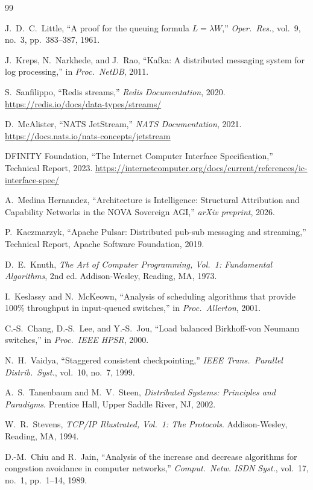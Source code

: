 \documentclass[12pt]{article}
\begin{document}
\begin{thebibliography}{99}

J.~D.~C.\ Little,
``A proof for the queuing formula $L = \lambda W$,''
\textit{Oper.\ Res.}, vol.~9, no.~3, pp.~383--387, 1961.

J.~Kreps, N.~Narkhede, and J.~Rao,
``Kafka: A distributed messaging system for log processing,''
in \textit{Proc.\ NetDB}, 2011.

S.~Sanfilippo,
``Redis streams,''
\textit{Redis Documentation}, 2020.
\url{https://redis.io/docs/data-types/streams/}

D.~McAlister,
``NATS JetStream,''
\textit{NATS Documentation}, 2021.
\url{https://docs.nats.io/nats-concepts/jetstream}

DFINITY Foundation,
``The Internet Computer Interface Specification,''
Technical Report, 2023.
\url{https://internetcomputer.org/docs/current/references/ic-interface-spec/}

A.~Medina Hernandez,
``Architecture is Intelligence: Structural Attribution and Capability Networks
in the NOVA Sovereign AGI,''
\textit{arXiv preprint}, 2026.

P.~Kaczmarzyk,
``Apache Pulsar: Distributed pub-sub messaging and streaming,''
Technical Report, Apache Software Foundation, 2019.

D.~E.\ Knuth,
\textit{The Art of Computer Programming, Vol.\ 1: Fundamental Algorithms},
2nd ed.
Addison-Wesley, Reading, MA, 1973.

I.~Keslassy and N.~McKeown,
``Analysis of scheduling algorithms that provide 100\% throughput in input-queued
switches,''
in \textit{Proc.\ Allerton}, 2001.

C.-S.\ Chang, D.-S.\ Lee, and Y.-S.\ Jou,
``Load balanced Birkhoff-von Neumann switches,''
in \textit{Proc.\ IEEE HPSR}, 2000.

N.~H.\ Vaidya,
``Staggered consistent checkpointing,''
\textit{IEEE Trans.\ Parallel Distrib.\ Syst.}, vol.~10, no.~7, 1999.

A.~S.\ Tanenbaum and M.~V.\ Steen,
\textit{Distributed Systems: Principles and Paradigms}.
Prentice Hall, Upper Saddle River, NJ, 2002.

W.~R.\ Stevens,
\textit{TCP/IP Illustrated, Vol.\ 1: The Protocols}.
Addison-Wesley, Reading, MA, 1994.

D.-M.\ Chiu and R.~Jain,
``Analysis of the increase and decrease algorithms for congestion avoidance in
computer networks,''
\textit{Comput.\ Netw. ISDN Syst.}, vol.~17, no.~1, pp.~1--14, 1989.

\end{thebibliography}
\end{document}
